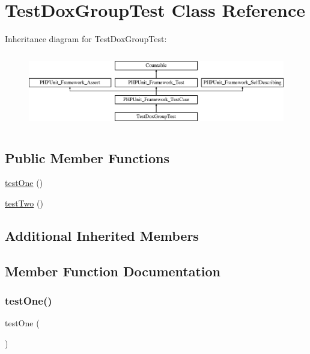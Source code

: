 \hypertarget{class_test_dox_group_test}{}\section{Test\+Dox\+Group\+Test Class Reference}
\label{class_test_dox_group_test}
Inheritance diagram for Test\+Dox\+Group\+Test\+:\begin{figure}[H]
\begin{center}
\leavevmode
\includegraphics[height=3.303835cm]{class_test_dox_group_test}
\end{center}
\end{figure}
\subsection*{Public Member Functions}
\begin{DoxyCompactItemize}
\item 
\mbox{\hyperlink{class_test_dox_group_test_afbf3ff88b322c6a7197ce02297cd23a0}{test\+One}} ()
\item 
\mbox{\hyperlink{class_test_dox_group_test_a4fb9974ce113d5d1db8075e0db0dc9b6}{test\+Two}} ()
\end{DoxyCompactItemize}
\subsection*{Additional Inherited Members}


\subsection{Member Function Documentation}
\mbox{\label{class_test_dox_group_test_afbf3ff88b322c6a7197ce02297cd23a0}} 
\subsubsection{\texorpdfstring{test\+One()}{testOne()}}
{\footnotesize\ttfamily test\+One (\begin{DoxyParamCaption}{ }\end{DoxyParamCaption})}

